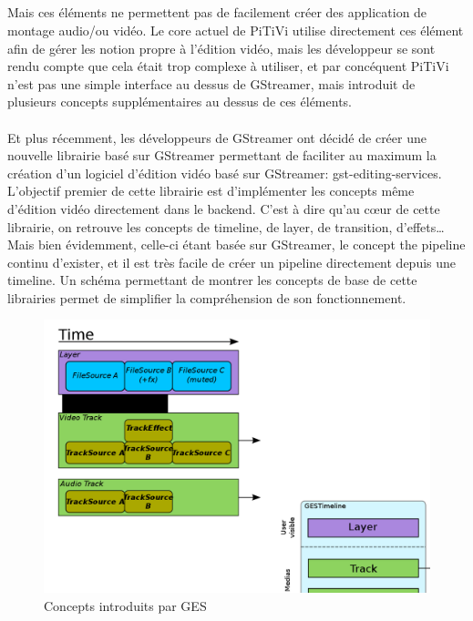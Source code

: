 \subparagraph{}

Mais ces éléments ne permettent pas de facilement créer des application
de montage audio/ou vidéo. Le core actuel de PiTiVi utilise directement
ces élément afin de gérer les notion propre à l'édition vidéo,
mais les développeur se sont rendu compte que cela était trop complexe
à utiliser, et par concéquent PiTiVi n'est pas une simple interface au
dessus de GStreamer, mais introduit de plusieurs concepts supplémentaires
au dessus de ces éléments.


\paragraph{}

Et plus récemment, les développeurs de GStreamer ont décidé de créer
une nouvelle librairie basé sur GStreamer permettant de faciliter
au maximum la création d'un logiciel d'édition vidéo basé sur
GStreamer: gst-editing-services.  L'objectif premier de cette librairie
est d'implémenter les concepts même d'édition vidéo directement dans
le backend. C'est à dire qu'au cœur de cette librairie, on retrouve
les concepts de timeline, de layer, de transition, d'effets\ldots Mais
bien évidemment, celle-ci étant basée sur GStreamer, le concept
the pipeline continu d'exister, et il est très facile de créer un
pipeline directement depuis une timeline. Un schéma permettant de
montrer les concepts de base de cette librairies permet de simplifier
la compréhension de son fonctionnement.

\begin{figure} [H]

  \begin{center}

    \includegraphics[width=1.0\textwidth]{images/ges}

  \end{center}

  \caption{Concepts introduits par GES}

  \label{Yes}

\end{figure}

